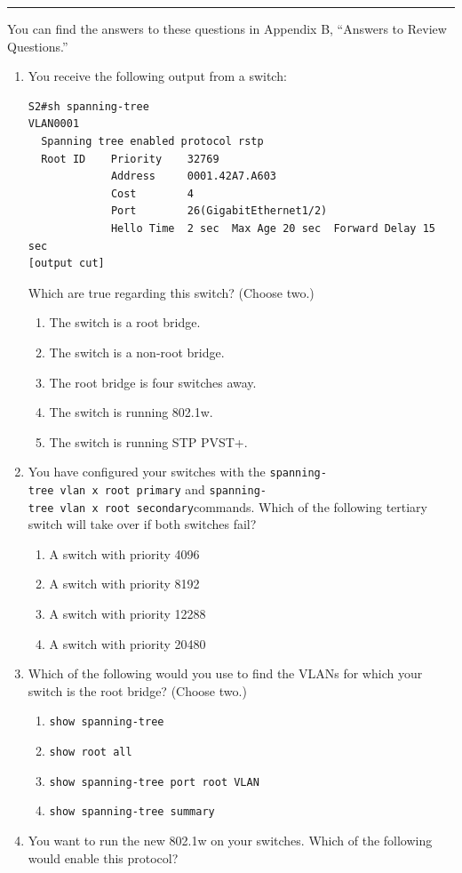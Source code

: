 \documentclass[b5paper,11pt]{memoir}
\begin{document}
\begin{center}\rule{0.5\linewidth}{0.5pt}\end{center}

You can find the answers to these questions in Appendix B, ``Answers to
Review Questions.''

\begin{enumerate}
\item
  You receive the following output from a switch:

\begin{verbatim}
S2#sh spanning-tree
VLAN0001
  Spanning tree enabled protocol rstp
  Root ID    Priority    32769
             Address     0001.42A7.A603
             Cost        4
             Port        26(GigabitEthernet1/2)
             Hello Time  2 sec  Max Age 20 sec  Forward Delay 15 sec
[output cut]
\end{verbatim}

  Which are true regarding this switch? (Choose two.)

  \begin{enumerate}
  \tightlist
  \item
    The switch is a root bridge.
  \item
    The switch is a non-root bridge.
  \item
    The root bridge is four switches away.
  \item
    The switch is running 802.1w.
  \item
    The switch is running STP PVST+.
  \end{enumerate}
\item
  You have configured your switches with the
  \texttt{spanning-tree\ vlan\ x\ root\ primary} and
  \texttt{spanning-tree\ vlan\ x\ root\ secondary}commands. Which of the
  following tertiary switch will take over if both switches fail?

  \begin{enumerate}
  \tightlist
  \item
    A switch with priority 4096
  \item
    A switch with priority 8192
  \item
    A switch with priority 12288
  \item
    A switch with priority 20480
  \end{enumerate}
\item
  Which of the following would you use to find the VLANs for which your
  switch is the root bridge? (Choose two.)

  \begin{enumerate}
  \tightlist
  \item
    \texttt{show\ spanning-tree}
  \item
    \texttt{show\ root\ all}
  \item
    \texttt{show\ spanning-tree\ port\ root\ VLAN}
  \item
    \texttt{show\ spanning-tree\ summary}
  \end{enumerate}
\item
  You want to run the
  new 802.1w on your switches. Which of the following would enable this
  protocol?


\end{enumerate}
\end{document}
